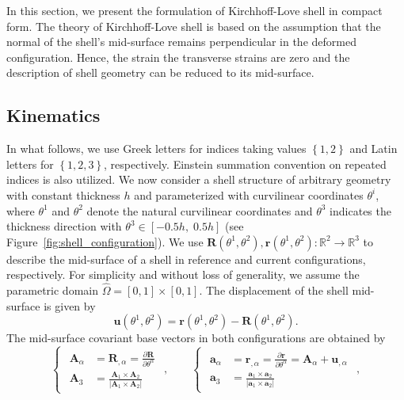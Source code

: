 In this section, we present the formulation of Kirchhoff-Love shell in compact form. The theory of Kirchhoff-Love shell is based on the assumption that the normal of the shell's mid-surface remains perpendicular in the deformed configuration. Hence, the strain the transverse strains are zero and the description of shell geometry can be reduced to its mid-surface.

\subsection{Kinematics}\label{sec:kinematics}

In what follows, we use Greek letters for indices taking values $\left\{1, 2\right\}$ and Latin letters for $\left\{1,2,3\right\}$, respectively. Einstein summation convention on repeated indices is also utilized. We now consider a shell structure of arbitrary geometry with constant thickness $h$ and parameterized with curvilinear coordinates $\theta^i$, where $\theta^1$ and $\theta^2$ denote the natural curvilinear coordinates and $\theta^3$ indicates the thickness direction with $\theta^3\in \left[-0.5h, \; 0.5h\right]$ (see Figure~\ref{fig:shell_configuration}). We use $\mathbf{R}(\theta^1,\theta^2), \mathbf{r}(\theta^1,\theta^2)\colon \mathbb{R}^2\rightarrow\mathbb{R}^3$ to describe the mid-surface of a shell in reference and current configurations, respectively. For simplicity and without loss of generality, we assume the parametric domain $\hat{\Omega}=[0,1]\times[0,1]$. The displacement of the shell mid-surface is given by
\begin{equation}
	\label{}
	\mathbf{u}(\theta^1,\theta^2) = \mathbf{r}(\theta^1,\theta^2)-\mathbf{R}(\theta^1,\theta^2).
\end{equation}
The mid-surface covariant base vectors in both configurations are obtained by
\begin{equation}
	\label{eq:mid_surface_base_vector}
	\begin{cases}
		\begin{aligned}
			\mathbf{A}_\alpha & =\mathbf{R}_{,\alpha} = \frac{\partial\mathbf{R}}{\partial\theta^\alpha}            \\
			\mathbf{A}_3      & = \frac{\mathbf{A}_1\times\mathbf{A}_2}{\vert{\mathbf{A}_1\times\mathbf{A}_2}\vert}
		\end{aligned}
	\end{cases},\qquad
	\begin{cases}
		\begin{aligned}
			\mathbf{a}_\alpha & =\mathbf{r}_{,\alpha} = \frac{\partial\mathbf{r}}{\partial\theta^\alpha}  =  \mathbf{A}_\alpha+\mathbf{u}_{,\alpha} \\
			\mathbf{a}_3      & = \frac{\mathbf{a}_1\times\mathbf{a}_2}{\vert{\mathbf{a}_1\times\mathbf{a}_2}\vert}
		\end{aligned}
	\end{cases},
\end{equation}
